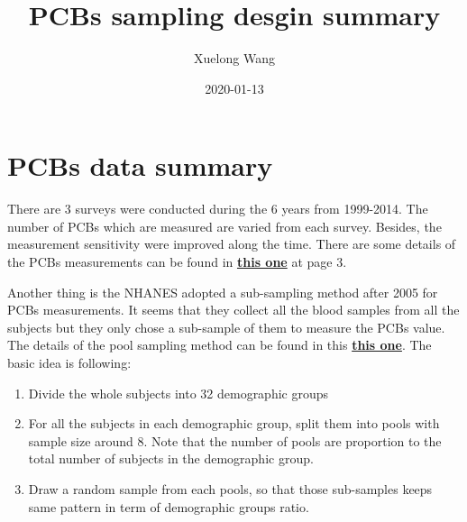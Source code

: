 \documentclass[]{article}
\title{PCBs sampling desgin summary}
\author{Xuelong Wang}
\date{2020-01-13}
\providecommand{\tightlist}{%
  \setlength{\itemsep}{0pt}\setlength{\parskip}{0pt}}
\begin{document}
\maketitle

{
\setcounter{tocdepth}{2}
\tableofcontents
}
\section{PCBs data summary}\label{pcbs-data-summary}

There are 3 surveys were conducted during the 6 years from 1999-2014.
The number of PCBs which are measured are varied from each survey.
Besides, the measurement sensitivity were improved along the time. There
are some details of the PCBs measurements can be found in
\href{https://www.epa.gov/sites/production/files/2015-06/documents/ace3pcbreviewpackage3-02-11.pdf}{\textbf{\textbf{this
one}}} at page 3.

Another thing is the NHANES adopted a sub-sampling method after 2005 for
PCBs measurements. It seems that they collect all the blood samples from
all the subjects but they only chose a sub-sample of them to measure the
PCBs value. The details of the pool sampling method can be found in this
\href{https://wwwn.cdc.gov/Nchs/Nhanes/2005-2006/PCBPOL_D.htm}{\textbf{\textbf{this
one}}}. The basic idea is following:

\begin{enumerate}
\def\labelenumi{\arabic{enumi}.}
\tightlist
\item
  Divide the whole subjects into 32 demographic groups\\
\item
  For all the subjects in each demographic group, split them into pools
  with sample size around 8. Note that the number of pools are
  proportion to the total number of subjects in the demographic group.\\
\item
  Draw a random sample from each pools, so that those sub-samples keeps
  same pattern in term of demographic groups ratio.
\end{enumerate}
\end{document}
